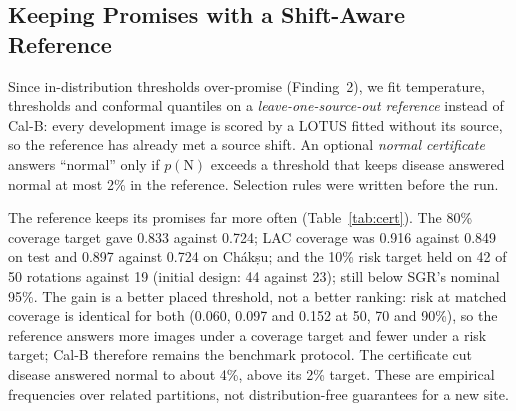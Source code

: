 \documentclass[runningheads]{llncs}
\begin{document}
\subsection{Keeping Promises with a Shift-Aware Reference}\label{sec:cert}
\begin{table}[tb]
\caption{Promises on unseen sources over 50 rotations, LOTUS after TS. Left: threshold for 80\% coverage. Middle: selective guaranteed risk (SGR~\cite{sgr}, $\delta=0.05$) threshold for risk $\le$ 10\%, with the rotations where test risk held and the rate of disease images answered normal (FR). Right: LAC coverage at nominal 0.90.}\label{tab:cert}
\centering\scriptsize\setlength{\tabcolsep}{2.6pt}
\end{table}

Since in-distribution thresholds over-promise (Finding~2), we fit temperature, thresholds and conformal quantiles on a \emph{leave-one-source-out reference} instead of Cal-B: every development image is scored by a LOTUS fitted without its source, so the reference has already met a source shift. An optional \emph{normal certificate} answers ``normal'' only if $p(\mathrm{N})$ exceeds a threshold that keeps disease answered normal at most 2\% in the reference. Selection rules were written before the run.

The reference keeps its promises far more often (Table~\ref{tab:cert}). The 80\% coverage target gave 0.833 against 0.724; LAC coverage was 0.916 against 0.849 on test and 0.897 against 0.724 on Ch\'ak\d{s}u; and the 10\% risk target held on 42 of 50 rotations against 19 (initial design: 44 against 23); still below SGR's nominal 95\%. The gain is a better placed threshold, not a better ranking: risk at matched coverage is identical for both (0.060, 0.097 and 0.152 at 50, 70 and 90\%), so the reference answers more images under a coverage target and fewer under a risk target; Cal-B therefore remains the benchmark protocol. The certificate cut disease answered normal to about 4\%, above its 2\% target. These are empirical frequencies over related partitions, not distribution-free guarantees for a new site.
\end{document}
